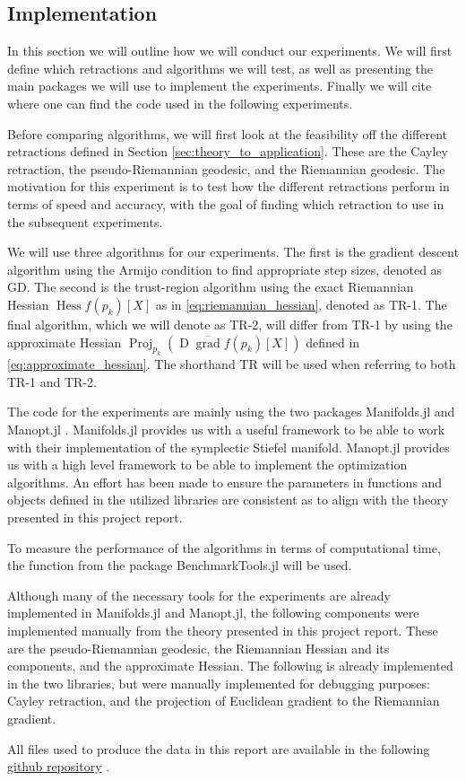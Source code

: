 \subsection{Implementation}
In this section we will outline how we will conduct our experiments. We will first define which retractions and algorithms we will test, as well as presenting the main packages we will use to implement the experiments. Finally we will cite where one can find the code used in the following experiments. 

Before comparing algorithms, we will first look at the feasibility off the different retractions defined in Section \ref{sec:theory_to_application}. These are the Cayley retraction, the pseudo-Riemannian geodesic, and the Riemannian geodesic. The motivation for this experiment is to test how the different retractions perform in terms of speed and accuracy, with the goal of finding which retraction to use in the subsequent experiments.

We will use three algorithms for our experiments. The first is the gradient descent algorithm using the Armijo condition to find appropriate step sizes, denoted as GD. The second is the trust-region algorithm using the exact Riemannian Hessian $\operatorname{Hess}f(p_{k})[X]$ as in \eqref{eq:riemannian_hessian}, denoted as TR-1. The final algorithm, which we will denote as TR-2, will differ from TR-1 by using the approximate Hessian $\operatorname{Proj}_{p_{k}}(\operatorname{D}\overline{\operatorname{grad}}f(p_{k})[X])$ defined in \eqref{eq:approximate_hessian}. The shorthand TR will be used when referring to both TR-1 and TR-2.

The code for the experiments are mainly using the two packages Manifolds.jl \cite{AxenBaranBergmannRzecki:2023} and Manopt.jl \cite{Bergmann2022}. Manifolds.jl provides us with a useful framework to be able to work with their implementation of the symplectic Stiefel manifold. Manopt.jl provides us with a high level framework to be able to implement the optimization algorithms. An effort has been made to ensure the parameters in functions and objects defined in the utilized libraries are consistent as to align with the theory presented in this project report. 

To measure the performance of the algorithms in terms of computational time, the function  from the package BenchmarkTools.jl \cite{BenchmarkTools:2016} will be used.

Although many of the necessary tools for the experiments are already implemented in Manifolds.jl and Manopt.jl, the following components were implemented manually from the theory presented in this project report. These are the pseudo-Riemannian geodesic, the Riemannian Hessian and its components, and the approximate Hessian. The following is already implemented in the two libraries, but were manually implemented for debugging purposes: Cayley retraction, and the projection of Euclidean gradient to the Riemannian gradient. 

All files used to produce the data in this report are available in the following \href{https://github.com/kellertuer/TMA4500-Project-Hovland-Symplectic-Stiefel.git}{github repository} \cite{Hovland2024}. 
